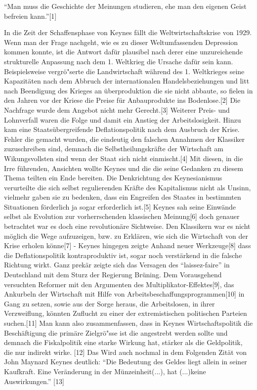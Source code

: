 \documentclass[
      onecolumn,
      a4paper,
      abstracton,
      parskip=half
      ,final
      ]{scrartcl}
\begin{document}
"`Man muss die Geschichte der Meinungen studieren, ehe man den eigenen Geist befreien kann."'[1]

In die Zeit der Schaffensphase von Keynes f{\"a}llt die Weltwirtschaftskrise von 1929. Wenn man
der Frage nachgeht, wie es zu dieser Weltumfassenden Depression kommen konnte, ist die Antwort
daf{\"u}r plausibel nach derer eine unzureichende strukturelle Anpassung nach dem  1. Weltkrieg
die Ursache daf{\"u}r sein kann. Beispielsweise vergr{\"o}{"s}erte die Landwirtschaft w{\"a}hrend des
1. Weltkrieges seine Kapazit{\"a}ten nach dem Abbruch der internationalen Handelsbeziehungen und
litt nach Beendigung des Krieges an {\"u}berproduktion die sie nicht abbaute, so fielen in den
Jahren vor der Kriese die Preise f{\"u}r Anbauprodukte ins Bodenlose.[2] Die Nachfrage wurde dem
Angebot nicht mehr Gerecht.[3] Weiterer Preis- und Lohnverfall waren die Folge und damit ein
Anstieg der Arbeitslosigkeit. Hinzu kam eine Staats{\"u}bergreifende Deflationspolitik nach dem
Ausbruch der Krise. Fehler die gemacht wurden, die eindeutig den falschen Annahmen der
Klassiker zuzuschreiben sind, demnach die Selbstheilungskr{\"a}fte der Wirtschaft am
Wikungsvollsten sind wenn der Staat sich nicht einmischt.[4]
Mit diesen, in die Irre f{\"u}hrenden, Ansichten wollte Keynes und die die seine Gedanken zu
diesem Thema teilten ein Ende bereiten. Die Denkrichtung des Keynesianismus verurteilte
die sich selbst regulierenden Kr{\"a}fte des Kapitalismus nicht als Unsinn, vielmehr gaben
sie zu bedenken, dass ein Engreifen des Staates in bestimmten Situationen f{\"o}rderlich ja sogar
erforderlich ist.[5] Keynes sah seine Einw{\"a}nde selbst als Evolution zur vorherrschenden klassischen
Meinung[6] doch genauer betrachtet war es doch eine revolution{\"a}re Sichtweise.
Den Klassikern war es nicht m{\"o}glich die Wege aufzuzeigen, bzw. zu Erkl{\"a}ren, wie sich die Wirtschaft
von der Krise erholen k{\"o}nne[7] - Keynes hingegen zeigte Anhand neuer Werkzeuge[8] dass die
Deflationspolitik kontraproduktiv ist, sogar noch verst{\"a}rkend in die falsche Richtung wirkt.
Ganz prek{\"a}r zeigte sich das Versagen des "`laissez-faire"' in Deutschland mit dem Sturz der Regierung
Br{\"u}ning. Dem Vorausgehend versuchten Reformer mit den Argumenten des Multiplikator-Effektes[9], das
Ankurbeln der Wirtschaft mit Hilfe von Arbeitsbeschaffungsprogrammen[10] in Gang zu setzen, sowie
aus der Sorge heraus, die Arbeitslosen, in ihrer Verzweiflung, k{\"o}nnten Zuflucht zu einer der
extremistischen politischen Parteien suchen.[11]
Man kann also zusammenfassen, dass in Keynes Wirtschaftspolitik die Besch{\"a}ftigung die prim{\"a}re
Zielgr{\"o}{"ss}e ist die angestrebt werden sollte und demnach die Fiskalpolitik eine starke Wirkung
hat, st{\"a}rker als die Geldpolitik, die nur indirekt wirke. [12] Das Wird auch nochmal in dem
Folgenden Zit{\"a}t von John Maynard Keynes deutlich:
"`Die Bedeutung des Geldes liegt allein in seiner Kaufkraft. Eine Ver{\"a}nderung in der M{\"u}nzeinheit(...),
hat (...)keine Auswirkungen."' [13]
\end{document}
